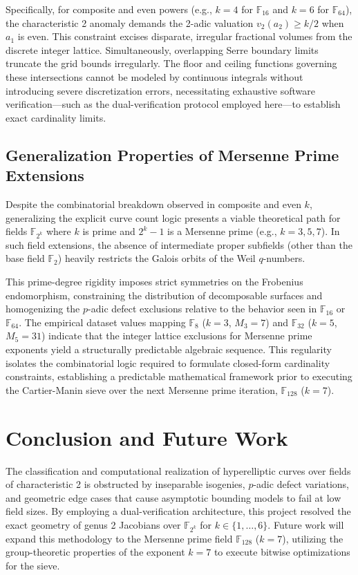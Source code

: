 \documentclass[12pt]{article}
\begin{document}
Specifically, for composite and even powers (e.g., $k=4$ for $\mathbb{F}_{16}$ and $k=6$ for $\mathbb{F}_{64}$), the characteristic 2 anomaly demands the 2-adic valuation $v_2(a_2) \ge k/2$ when $a_1$ is even. This constraint excises disparate, irregular fractional volumes from the discrete integer lattice. Simultaneously, overlapping Serre boundary limits truncate the grid bounds irregularly. The floor and ceiling functions governing these intersections cannot be modeled by continuous integrals without introducing severe discretization errors, necessitating exhaustive software verification---such as the dual-verification protocol employed here---to establish exact cardinality limits.

\subsection{Generalization Properties of Mersenne Prime Extensions}
Despite the combinatorial breakdown observed in composite and even $k$, generalizing the explicit curve count logic presents a viable theoretical path for fields $\mathbb{F}_{2^k}$ where $k$ is prime and $2^k - 1$ is a Mersenne prime (e.g., $k=3, 5, 7$). In such field extensions, the absence of intermediate proper subfields (other than the base field $\mathbb{F}_2$) heavily restricts the Galois orbits of the Weil $q$-numbers. 

This prime-degree rigidity imposes strict symmetries on the Frobenius endomorphism, constraining the distribution of decomposable surfaces and homogenizing the $p$-adic defect exclusions relative to the behavior seen in $\mathbb{F}_{16}$ or $\mathbb{F}_{64}$. The empirical dataset values mapping $\mathbb{F}_8$ ($k=3$, $M_3=7$) and $\mathbb{F}_{32}$ ($k=5$, $M_5=31$) indicate that the integer lattice exclusions for Mersenne prime exponents yield a structurally predictable algebraic sequence. This regularity isolates the combinatorial logic required to formulate closed-form cardinality constraints, establishing a predictable mathematical framework prior to executing the Cartier-Manin sieve over the next Mersenne prime iteration, $\mathbb{F}_{128}$ ($k=7$).

\section{Conclusion and Future Work}
The classification and computational realization of hyperelliptic curves over fields of characteristic 2 is obstructed by inseparable isogenies, $p$-adic defect variations, and geometric edge cases that cause asymptotic bounding models to fail at low field sizes. By employing a dual-verification architecture, this project resolved the exact geometry of genus 2 Jacobians over $\mathbb{F}_{2^k}$ for $k \in \{1, \dots, 6\}$. Future work will expand this methodology to the Mersenne prime field $\mathbb{F}_{128}$ ($k=7$), utilizing the group-theoretic properties of the exponent $k=7$ to execute bitwise optimizations for the sieve.
\end{document}
